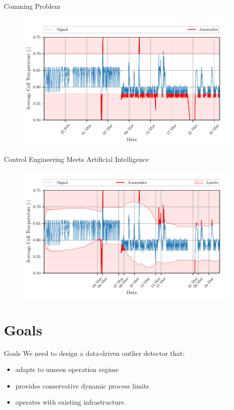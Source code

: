 \documentclass[aspectratio=169]{beamer}
\begin{document}
\begin{frame}{Comming Problem}
    \begin{figure}[htpb]
        \begin{center}
            \includegraphics[width=0.75\linewidth]{../ilustrate/pc2023/bess/naive/full_thresh.pdf}
        \end{center}
    \end{figure}
\end{frame}

\begin{frame}{Control Engineering Meets Artificial Intelligence}
    \begin{figure}[htpb]
        \begin{center}
            \includegraphics[width=0.75\linewidth]{../ilustrate/pc2023/bess/Average_Cell_Temperature_sliding_thresh.pdf}
        \end{center}
    \end{figure}
\end{frame}

\section{Goals}

\begin{frame}{Goals}
    We need to design a data-driven outlier detector that:
    \begin{itemize}
        \item adapts to unseen operation regime
        \item provides conservative dynamic process limits
        \item operates with existing infrastructure
    \end{itemize}
\end{frame}
\end{document}
